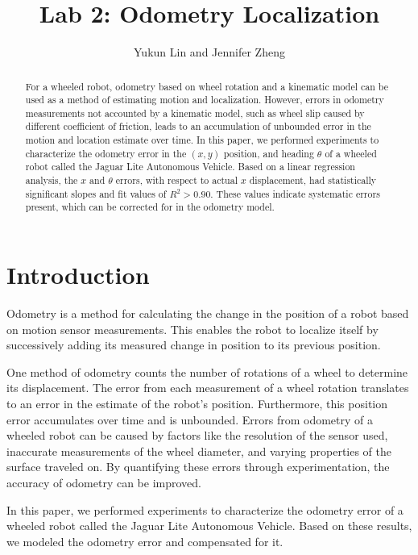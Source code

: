 \documentclass[conference]{../IEEEtran}
\begin{document}
\title{Lab 2: Odometry Localization}
\author{Yukun Lin and Jennifer Zheng}
\maketitle

\begin{abstract}
  For a wheeled robot, odometry based on wheel rotation and a kinematic model can be used
  as a method of estimating motion and localization. However, errors in odometry
  measurements not accounted by a kinematic model, such as wheel slip caused by different
  coefficient of friction, leads to an accumulation of unbounded error in the motion and
  location estimate over time.  In this paper, we performed experiments to characterize
  the odometry error in the $(x, y)$ position, and heading $\theta$ of a wheeled robot called the
  Jaguar Lite Autonomous Vehicle. Based on a linear regression analysis, the $x$ and
  $\theta$ errors, with respect to actual $x$ displacement, had statistically significant
  slopes and fit values of $R^2>0.90$. These values indicate systematic errors present,
  which can be corrected for in the odometry model.
\end{abstract}

\section{Introduction}
Odometry is a method for calculating the change in the position of a robot based on motion
sensor measurements. This enables the robot to localize itself by successively adding its
measured change in position to its previous position.

One method of odometry counts the number of rotations of a wheel to determine its
displacement. The error from each measurement of a wheel rotation translates to an error
in the estimate of the robot's position. Furthermore, this position error accumulates over
time and is unbounded. Errors from odometry of a wheeled robot can be caused by factors
like the resolution of the sensor used, inaccurate measurements of the wheel diameter, and
varying properties of the surface traveled on. By quantifying these errors through
experimentation, the accuracy of odometry can be improved.

In this paper, we performed experiments to characterize the odometry error of a wheeled
robot called the Jaguar Lite Autonomous Vehicle. Based on these results, we modeled the
odometry error and compensated for it.
\end{document}
